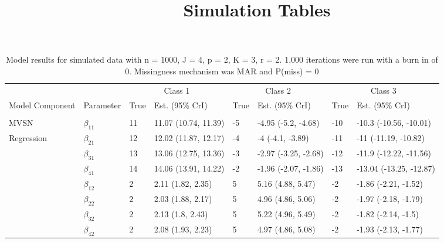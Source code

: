 \documentclass[]{article}
\title{Simulation Tables}
\author{}
\date{}
\begin{document}
\maketitle

\begin{table}[t]

\caption{\label{tab:unnamed-chunk-5}Model results for simulated data with n = 1000, J = 4, p = 2, K = 3, r = 2. 1,000 iterations were run with a burn in of 0. Missingness mechanism was MAR and P(miss) = 0}
\centering
\fontsize{8}{10}\selectfont
\begin{tabular}{llllllll}
\toprule
\multicolumn{2}{c}{ } & \multicolumn{2}{c}{Class 1} & \multicolumn{2}{c}{Class 2} & \multicolumn{2}{c}{Class 3} \\
\cmidrule(l{3pt}r{3pt}){3-4} \cmidrule(l{3pt}r{3pt}){5-6} \cmidrule(l{3pt}r{3pt}){7-8}
Model Component & Parameter & True & Est. (95\% CrI) & True & Est. (95\% CrI) & True & Est. (95\% CrI)\\
\midrule
\addlinespace[0.3em]
\multicolumn{8}{l}{\textbf{ }}\\
\hspace{1em}MVSN & $\beta_{11}$ & 11 & 11.07 (10.74, 11.39) & -5 & -4.95 (-5.2, -4.68) & -10 & -10.3 (-10.56, -10.01)\\
\hspace{1em}Regression & $\beta_{21}$ & 12 & 12.02 (11.87, 12.17) & -4 & -4 (-4.1, -3.89) & -11 & -11 (-11.19, -10.82)\\
\hspace{1em} & $\beta_{31}$ & 13 & 13.06 (12.75, 13.36) & -3 & -2.97 (-3.25, -2.68) & -12 & -11.9 (-12.22, -11.56)\\
\hspace{1em} & $\beta_{41}$ & 14 & 14.06 (13.91, 14.22) & -2 & -1.96 (-2.07, -1.86) & -13 & -13.04 (-13.25, -12.87)\\
\hspace{1em} & $\beta_{12}$ & 2 & 2.11 (1.82, 2.35) & 5 & 5.16 (4.88, 5.47) & -2 & -1.86 (-2.21, -1.52)\\
\hspace{1em} & $\beta_{22}$ & 2 & 2.03 (1.88, 2.17) & 5 & 4.96 (4.86, 5.06) & -2 & -1.97 (-2.18, -1.79)\\
\hspace{1em} & $\beta_{32}$ & 2 & 2.13 (1.8, 2.43) & 5 & 5.22 (4.96, 5.49) & -2 & -1.82 (-2.14, -1.5)\\
\hspace{1em} & $\beta_{42}$ & 2 & 2.08 (1.93, 2.23) & 5 & 4.97 (4.86, 5.08) & -2 & -1.93 (-2.13, -1.77)\\

\end{tabular}
\end{table}
\end{document}
